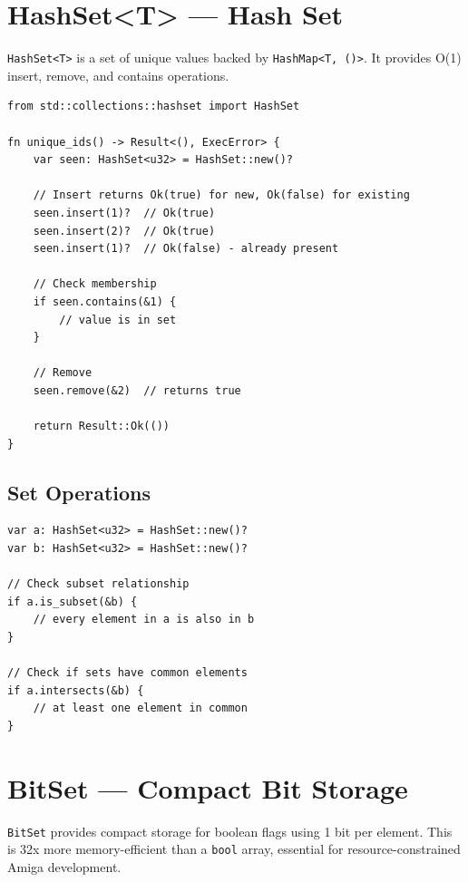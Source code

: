 \section{HashSet<T> --- Hash Set}
\label{sec:hashset}

\texttt{HashSet<T>} is a set of unique values backed by \texttt{HashMap<T, ()>}. It provides O(1) insert, remove, and contains operations.

\begin{lstlisting}
from std::collections::hashset import HashSet

fn unique_ids() -> Result<(), ExecError> {
    var seen: HashSet<u32> = HashSet::new()?

    // Insert returns Ok(true) for new, Ok(false) for existing
    seen.insert(1)?  // Ok(true)
    seen.insert(2)?  // Ok(true)
    seen.insert(1)?  // Ok(false) - already present

    // Check membership
    if seen.contains(&1) {
        // value is in set
    }

    // Remove
    seen.remove(&2)  // returns true

    return Result::Ok(())
}
\end{lstlisting}

\subsection{Set Operations}

\begin{lstlisting}
var a: HashSet<u32> = HashSet::new()?
var b: HashSet<u32> = HashSet::new()?

// Check subset relationship
if a.is_subset(&b) {
    // every element in a is also in b
}

// Check if sets have common elements
if a.intersects(&b) {
    // at least one element in common
}
\end{lstlisting}

\section{BitSet --- Compact Bit Storage}
\label{sec:bitset}

\texttt{BitSet} provides compact storage for boolean flags using 1 bit per element. This is 32x more memory-efficient than a \texttt{bool} array, essential for resource-constrained Amiga development.


